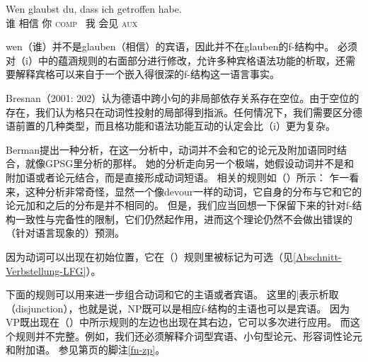 {\ea
\gll Wen glaubst du, dass ich getroffen habe.\\
    谁 相信 你 \textsc{comp}  我 会见 \textsc{aux} \\
\z

\noindent
wen（谁）并不是glauben（相信）的宾语，因此并不在glauben的f-结构中。
必须对（i）中的蕴涵规则的右面部分进行修改，允许多种宾格语法功能的析取，还需要解释宾格可以来自于一个嵌入得很深的f-结构这一语言事实。

Bresnan（2001: 202）认为德语中跨小句的非局部依存关系存在空位。由于空位的存在，我们认为格只在动词性投射的局部得到指派。任何情况下，我们需要区分德语前置的几种类型，而且格功能和语法功能互动的认定会比（i）更为复杂。
}
\ea
\label{le-verschlingen}
\z

\noindent
Berman提出一种分析，在这一分析中，动词并不会和它的论元及附加语同时结合，就像GPSG\indexgpsgc 里分析的那样。
她的分析走向另一个极端，她假设动词并不是和附加语或者论元结合，而是直接形成动词短语。
相关的规则如（）所示：
\ea
\label{LFG-v-vp}
\z
乍一看来，这种分析非常奇怪，显然一个像devour一样的动词，它自身的分布与它和它的论元加和之后的分布是并不相同的。
但是，我们应当回想一下保留下来的针对f-结构一致性与完备性的限制，它们仍然起作用，进而这个理论仍然不会做出错误的（针对语言现象的）预测。

因为动词可以出现在初始位置，它在（）规则里被标记为可选（见\ref{Abschnitt-Verbstellung-LFG}）。

下面的规则可以用来进一步组合动词和它的主语或者宾语。
\ea
\label{lfg-vp-regel}
\z
这里的|\isce{$\vert$}{$\vert$}表示析取（disjunction），也就是说，NP既可以是相应f-结构的主语也可以是宾语。
因为VP既出现在（）中所示规则的左边也出现在其右边，它可以多次进行应用。
而这个规则并不完整。例如，我们还必须解释介词型宾语、小句型论元、形容词性论元和附加语。
参见第\pageref{fn-zp}页的脚注\ref{fn-zp}。

